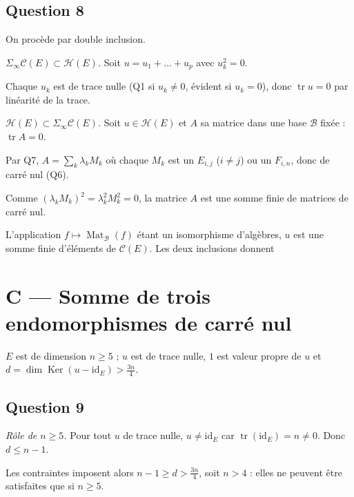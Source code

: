 \documentclass[11pt,a4paper]{article}
\newcommand{\equationajustee}[1]{%
  \sbox{\boiteequation}{$\displaystyle #1$}%
  \ifdim\wd\boiteequation>\linewidth
    \[\resizebox{\linewidth}{!}{\usebox{\boiteequation}}\]%
  \else
    \[#1\]%
  \fi}
\begin{document}
\hypertarget{question-8}{%
\subsection{Question 8}\label{question-8}}

On procède par double inclusion.

\emph{\(\Sigma_\infty\mathcal C(E)\subset\mathcal H(E)\).} Soit \(u=u_1+\dots+u_p\) avec \(u_k^2=0\).

Chaque \(u_k\) est de trace nulle (Q1 si \(u_k\neq0\), évident si \(u_k=0\)), donc \(\operatorname{tr}u=0\) par linéarité de la trace.

\emph{\(\mathcal H(E)\subset\Sigma_\infty\mathcal C(E)\).} Soit \(u\in\mathcal H(E)\) et \(A\) sa matrice dans une base \(\mathcal B\) fixée : \(\operatorname{tr}A=0\).

Par Q7, \(A=\sum_k\lambda_kM_k\) où chaque \(M_k\) est un \(E_{i,j}\) (\(i\neq j\)) ou un \(F_{i,n}\), donc de carré nul (Q6).

Comme \((\lambda_kM_k)^2=\lambda_k^2M_k^2=0\), la matrice \(A\) est une somme finie de matrices de carré nul.

L'application \(f\mapsto\operatorname{Mat}_{\mathcal B}(f)\) étant un isomorphisme d'algèbres, \(u\) est une somme finie d'éléments de \(\mathcal C(E)\). Les deux inclusions donnent
\equationajustee{\boxed{\Sigma_\infty\mathcal C(E)=\mathcal H(E).}}

\hypertarget{c-somme-de-trois-endomorphismes-de-carruxe9-nul}{%
\section{C --- Somme de trois endomorphismes de carré nul}\label{c-somme-de-trois-endomorphismes-de-carruxe9-nul}}

\(E\) est de dimension \(n\ge5\) ; \(u\) est de trace nulle, \(1\) est valeur propre de \(u\) et \(d=\dim\operatorname{Ker}(u-{\mathrm{id}}_E)>\frac{3n}4\).

\hypertarget{question-9}{%
\subsection{Question 9}\label{question-9}}

\emph{Rôle de \(n\ge5\).} Pour tout \(u\) de trace nulle, \(u\neq{\mathrm{id}}_E\) car \(\operatorname{tr}({\mathrm{id}}_E)=n\neq0\). Donc \(d\le n-1\).

Les contraintes imposent alors \(n-1\ge d>\frac{3n}4\), soit \(n>4\) : elles ne peuvent être satisfaites que si \(n\ge5\).
\end{document}
